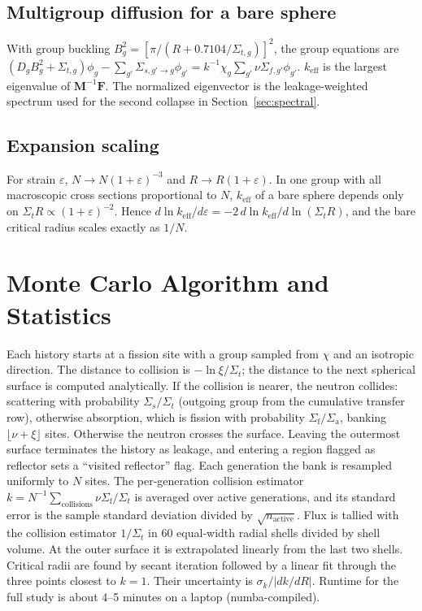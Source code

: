 \documentclass[11pt,letterpaper]{article}
\newcommand{\keff}{k_\mathrm{eff}}
\newcommand{\Sig}[1]{\Sigma_\mathrm{#1}}
\begin{document}
\subsection{Multigroup diffusion for a bare sphere}
With group buckling $B_g^2 = [\pi/(R + 0.7104/\Sigma_{t,g})]^2$, the group equations are $(D_gB_g^2 + \Sigma_{t,g})\phi_g - \sum_{g'}\Sigma_{s,g'\to g}\phi_{g'} = k^{-1}\chi_g\sum_{g'}\nu\Sigma_{f,g'}\phi_{g'}$. $\keff$ is the largest eigenvalue of $\mathbf M^{-1}\mathbf F$. The normalized eigenvector is the leakage-weighted spectrum used for the second collapse in Section~\ref{sec:spectral}.

\subsection{Expansion scaling}
For strain $\varepsilon$, $N \to N(1+\varepsilon)^{-3}$ and $R \to R(1+\varepsilon)$. In one group with all macroscopic cross sections proportional to $N$, $\keff$ of a bare sphere depends only on $\Sigma_tR \propto (1+\varepsilon)^{-2}$. Hence $d\ln\keff/d\varepsilon = -2\,d\ln\keff/d\ln(\Sigma_tR)$, and the bare critical radius scales exactly as $1/N$.

\section{Monte Carlo Algorithm and Statistics}
\label{app:mc}
Each history starts at a fission site with a group sampled from $\chi$ and an isotropic direction. The distance to collision is $-\ln\xi/\Sigma_t$; the distance to the next spherical surface is computed analytically. If the collision is nearer, the neutron collides: scattering with probability $\Sigma_s/\Sigma_t$ (outgoing group from the cumulative transfer row), otherwise absorption, which is fission with probability $\Sig{f}/\Sig{a}$, banking $\lfloor\nu+\xi\rfloor$ sites. Otherwise the neutron crosses the surface. Leaving the outermost surface terminates the history as leakage, and entering a region flagged as reflector sets a ``visited reflector'' flag. Each generation the bank is resampled uniformly to $N$ sites. The per-generation collision estimator $k = N^{-1}\sum_{\text{collisions}}\nu\Sig{f}/\Sigma_t$ is averaged over active generations, and its standard error is the sample standard deviation divided by $\sqrt{n_\mathrm{active}}$. Flux is tallied with the collision estimator $1/\Sigma_t$ in 60 equal-width radial shells divided by shell volume. At the outer surface it is extrapolated linearly from the last two shells. Critical radii are found by secant iteration followed by a linear fit through the three points closest to $k=1$. Their uncertainty is $\sigma_k/|dk/dR|$. Runtime for the full study is about 4--5 minutes on a laptop (numba-compiled).
\end{document}
